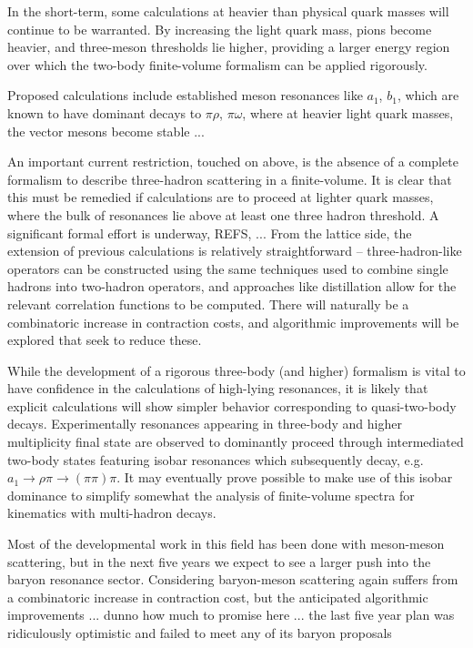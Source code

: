 {In the short-term, some calculations at heavier than physical quark masses will continue to be warranted. By increasing the light quark mass, pions become heavier, and three-meson thresholds lie higher, providing a larger energy region over which the two-body finite-volume formalism can be applied rigorously. 


Proposed calculations include established meson resonances like $a_1$, $b_1$, which are known to have dominant decays to $\pi \rho$, $\pi \omega$, where at heavier light quark masses, the vector mesons become stable ...



An important current restriction, touched on above, is the absence of a complete formalism to describe three-hadron scattering in a  finite-volume. It is clear that this must be remedied if calculations are to proceed at lighter quark masses, where the bulk of resonances lie above at least one three hadron threshold. A significant formal effort is underway, REFS, ... From the lattice side, the extension of previous calculations is relatively straightforward -- three-hadron-like operators can be constructed using the same techniques used to combine single hadrons into two-hadron operators, and approaches like distillation allow for the relevant correlation functions to be computed. There will naturally be a combinatoric increase in contraction costs, and algorithmic improvements will be explored that seek to reduce these.

While the development of a rigorous three-body (and higher) formalism is vital to have confidence in the calculations of high-lying resonances, it is likely that explicit calculations will show simpler behavior corresponding to quasi-two-body decays. Experimentally resonances appearing in three-body and higher multiplicity final state are observed to dominantly proceed through intermediated two-body states featuring isobar resonances which subsequently decay, e.g. $a_1 \to \rho \pi \to (\pi\pi) \pi$. It may eventually prove possible to make use of this isobar dominance to simplify somewhat the analysis of finite-volume spectra for kinematics with multi-hadron decays.

Most of the developmental work in this field has been done with meson-meson scattering, but in the next five years we expect to see a larger push into the baryon resonance sector. Considering baryon-meson scattering again suffers from a combinatoric increase in contraction cost, but the anticipated algorithmic improvements ... {\color{red} dunno how much to promise here ... the last five year plan was ridiculously optimistic and failed to meet any of its baryon proposals}

}
